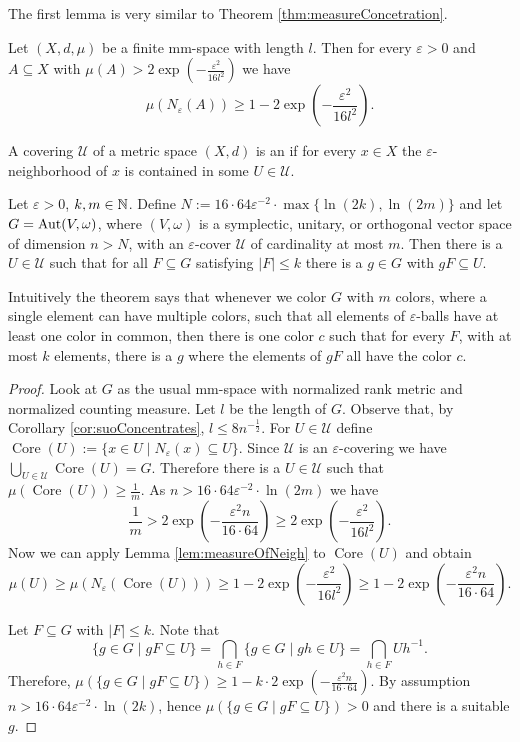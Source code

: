 The first lemma is very similar to Theorem \ref{thm:measureConcetration}.
\begin{lemma}\label{lem:measureOfNeigh}
	Let $(X,d,\mu)$ be a finite mm-space with length $l$. Then for every $\varepsilon>0$ and $A\subseteq X$ with $\mu(A)>2\exp\left(-\frac{\varepsilon^2}{16l^2}\right)$ we have
	\[\mu(N_\varepsilon(A))\geq 1-2\exp\left(-\frac{\varepsilon^2}{16l^2}\right).\]
\end{lemma}
		
		
A covering $\mathcal{U}$ of a metric space $(X,d)$ is an  if for every $x\in X$ the $\varepsilon$-neighborhood of $x$ is contained in some $U\in\mathcal{U}$.
		
\begin{theorem}
	Let $\varepsilon>0$, $k,m\in\mathbb{N}$. Define $N:=16\cdot64\varepsilon^{-2}\cdot\max\{\ln(2k),\ln(2m)\}$ and let $G=\operatorname{Aut}(V,\omega)$, where $(V,\omega)$ is a symplectic, unitary, or orthogonal vector space of dimension $n>N$, with an $\varepsilon$-cover $\mathcal{U}$ of cardinality at most $m$. Then there is a $U\in\mathcal{U}$ such that for all $F\subseteq G$ satisfying $|F|\leq k$ there is a $g\in G$ with $gF\subseteq U$.
\end{theorem}
Intuitively the theorem says that whenever we color $G$ with $m$ colors, where a single element can have multiple colors, such that all elements of $\varepsilon$-balls have at least one color in common, then there is one color $c$ such that for every $F$, with at most $k$ elements, there is a $g$ where the elements of $gF$ all have the color $c$.
\begin{proof}
	\def\core{\operatorname{Core}}
	Look at $G$ as the usual mm-space with normalized rank metric and normalized counting measure.
	Let $l$ be the length of $G$. Observe that, by Corollary \ref{cor:suoConcentrates}, $l\leq 8n^{-\frac{1}{2}}$.
	For $U\in \mathcal{U}$ define $\core(U):=\{x\in U\mid N_\varepsilon(x)\subseteq U\}$. Since $\mathcal{U}$ is an $\varepsilon$-covering we have $\bigcup_{U\in\mathcal{U}}\core(U)=G$. Therefore there is a $U\in\mathcal{U}$ such that $\mu(\core(U))\geq\frac{1}{m}$. As $n>16\cdot64\varepsilon^{-2}\cdot\ln(2m)$ we have
	\[\frac{1}{m}>2\exp\left(-\frac{\varepsilon^2n}{16\cdot64}\right)\geq 2\exp\left(-\frac{\varepsilon^2}{ 16l^2}\right).\]
	Now we can apply Lemma \ref{lem:measureOfNeigh} to $\core(U)$ and obtain
	\[\mu(U)\geq\mu(N_\varepsilon(\core(U)))\geq 1-2\exp\left(-\frac{\varepsilon^2}{ 16l^2}\right)\geq1-2\exp\left(-\frac{\varepsilon^2n}{16\cdot64}\right). \]
				
	Let $F\subseteq G$ with $|F|\leq k$. Note that 
	\[\{g\in G\mid gF\subseteq U\}=\bigcap_{h\in F}\{g\in G\mid gh\in U\}=\bigcap_{h\in F}Uh^{-1}.\]
	Therefore, $\mu(\{g\in G\mid gF\subseteq U\})\geq 1-k\cdot2\exp\left(-\frac{\varepsilon^2n}{16\cdot64}\right)$. By assumption $n>16\cdot64\varepsilon^{-2}\cdot\ln(2k)$, hence $\mu(\{g\in G\mid gF\subseteq U\})>0$ and there is a suitable $g$. 
\end{proof}
		
		
